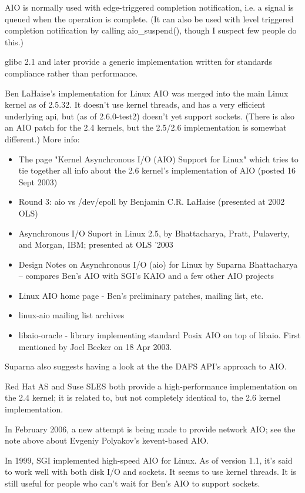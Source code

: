 \documentclass[12pt, twoside, a4paper, xetex]{report}
\begin{document}
AIO is normally used with edge-triggered completion notification, i.e. a signal is queued when the operation is complete. (It can also be used with level triggered completion notification by calling aio\_suspend(), though I suspect few people do this.)

glibc 2.1 and later provide a generic implementation written for standards compliance rather than performance.

Ben LaHaise's implementation for Linux AIO was merged into the main Linux kernel as of 2.5.32. It doesn't use kernel threads, and has a very efficient underlying api, but (as of 2.6.0-test2) doesn't yet support sockets. (There is also an AIO patch for the 2.4 kernels, but the 2.5/2.6 implementation is somewhat different.) More info:

\begin{itemize}
\item The page "Kernel Asynchronous I/O (AIO) Support for Linux" which tries to tie together all info about the 2.6 kernel's implementation of AIO (posted 16 Sept 2003)
\item Round 3: aio vs /dev/epoll by Benjamin C.R. LaHaise (presented at 2002 OLS)
\item Asynchronous I/O Suport in Linux 2.5, by Bhattacharya, Pratt, Pulaverty, and Morgan, IBM; presented at OLS '2003
\item Design Notes on Asynchronous I/O (aio) for Linux by Suparna Bhattacharya -- compares Ben's AIO with SGI's KAIO and a few other AIO projects
\item Linux AIO home page - Ben's preliminary patches, mailing list, etc.
\item linux-aio mailing list archives
\item libaio-oracle - library implementing standard Posix AIO on top of libaio. First mentioned by Joel Becker on 18 Apr 2003.
\end{itemize}

Suparna also suggests having a look at the the DAFS API's approach to AIO.

Red Hat AS and Suse SLES both provide a high-performance implementation on the 2.4 kernel; it is related to, but not completely identical to, the 2.6 kernel implementation.

In February 2006, a new attempt is being made to provide network AIO; see the note above about Evgeniy Polyakov's kevent-based AIO.

In 1999, SGI implemented high-speed AIO for Linux. As of version 1.1, it's said to work well with both disk I/O and sockets. It seems to use kernel threads. It is still useful for people who can't wait for Ben's AIO to support sockets.
\end{document}
